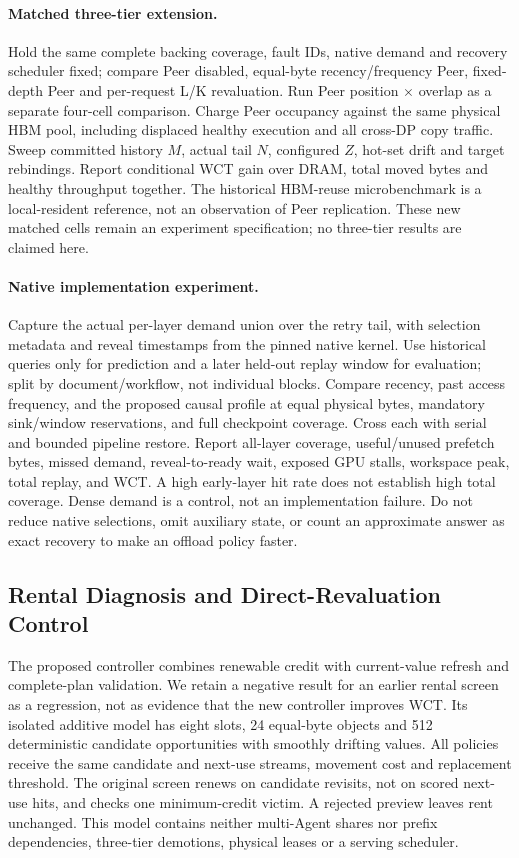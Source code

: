 \documentclass[sigplan,10pt,anonymous,nonacm]{acmart}
\begin{document}
\paragraph{Matched three-tier extension.}
Hold the same complete backing coverage, fault IDs, native demand and recovery
scheduler fixed; compare Peer disabled, equal-byte recency/frequency Peer,
fixed-depth Peer and per-request L/K revaluation. Run Peer position
$\times$ overlap as a separate four-cell comparison. Charge Peer occupancy
against the same physical HBM pool, including displaced healthy execution
and all cross-DP copy traffic. Sweep committed history $M$, actual tail
$N$, configured $Z$, hot-set drift and target rebindings. Report conditional
WCT gain over DRAM, total moved bytes and healthy throughput together.
The historical HBM-reuse microbenchmark is a local-resident reference,
not an observation of Peer replication. These new matched cells remain an
experiment specification; no three-tier results are claimed here.

\paragraph{Native implementation experiment.}
Capture the actual per-layer demand union over the retry tail, with
selection metadata and reveal timestamps from the pinned native kernel.
Use historical queries only for prediction and a later held-out replay
window for evaluation; split by document/workflow, not individual blocks.
Compare recency, past access frequency, and the proposed causal profile
at equal physical bytes, mandatory sink/window reservations, and full
checkpoint coverage. Cross each with serial and bounded pipeline restore.
Report all-layer coverage, useful/unused prefetch bytes, missed demand,
reveal-to-ready wait, exposed GPU stalls, workspace peak, total replay,
and WCT. A high early-layer hit rate does not establish high total
coverage. Dense demand is a control, not an implementation failure.
Do not reduce native selections, omit auxiliary state, or count an
approximate answer as exact recovery to make an offload policy faster.

\FloatBarrier
\subsection{Rental Diagnosis and Direct-Revaluation Control}
\label{sec:eval-rental}

The proposed controller combines renewable credit with current-value
refresh and complete-plan validation. We retain a negative result for
an earlier rental screen as a regression, not as evidence that the new
controller improves WCT. Its isolated additive model has eight slots,
24 equal-byte objects and 512 deterministic candidate opportunities with
smoothly drifting values. All policies receive the same candidate and
next-use streams, movement cost and replacement threshold. The original
screen renews on candidate revisits, not on scored next-use hits, and
checks one minimum-credit victim. A rejected preview leaves rent unchanged.
This model contains neither multi-Agent shares nor prefix dependencies,
three-tier demotions, physical leases or a serving scheduler.
\end{document}

